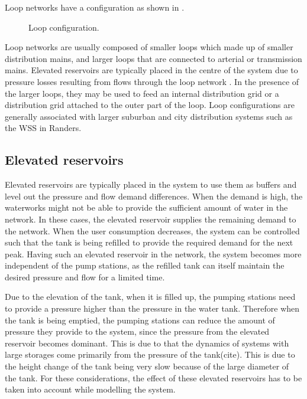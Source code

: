 Loop networks have a configuration as shown in . 

\begin{figure}[H]
\centering
 
\caption{Loop configuration.}
\label{fig:loop_configuration}
\end{figure}

Loop networks are usually composed of smaller loops which made up of smaller distribution mains, and larger loops that are connected to arterial or transmission mains. Elevated reservoirs are typically placed in the centre of the system due to pressure losses resulting from flows through the loop network \cite{council2007drinking}. In the presence of the larger loops, they may be used to feed an internal distribution grid or a distribution grid attached to the outer part of the loop. Loop configurations are generally associated with larger suburban and city distribution systems such as the WSS in Randers\cite{council2007drinking}. 

\subsection{Elevated reservoirs}
\label{elevated_reservoirs}

Elevated reservoirs are typically placed in the system to use them as buffers and level out the pressure and flow demand differences. When the demand is high, the waterworks might not be able to provide the sufficient amount of water in the network. In these cases, the elevated reservoir supplies the remaining demand to the network. When the user consumption decreases, the system can be controlled such that the tank is being refilled to provide the required demand for the next peak. Having such an elevated reservoir in the network, the system becomes more independent of the pump stations, as the refilled tank can itself maintain the desired pressure and flow for a limited time. 

Due to the elevation of the tank, when it is filled up, the pumping stations need to provide a pressure higher than the pressure in the water tank. Therefore when the tank is being emptied, the pumping stations can reduce the amount of pressure they provide to the system, since the pressure from the elevated reservoir becomes dominant. This is due to that the dynamics of systems with large storages come primarily from the pressure of the tank(cite). This is due to the height change of the tank being very slow because of the large diameter of the tank. For these considerations, the effect of these elevated reservoirs has to be taken into account while modelling the system. 

